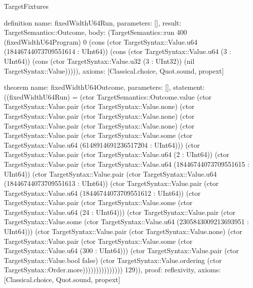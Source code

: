 \begin{lexlean}{TargetFixtures}
\begin{semanticmodule}
definition{
  name: fixedWidthU64Run,
  parameters: [],
  result: TargetSemantics::Outcome,
  body: (TargetSemantics::run 400 (fixedWidthU64Program) 0 (cons (ctor TargetSyntax::Value.u64 (18446744073709551614 : UInt64)) (cons (ctor TargetSyntax::Value.u64 (3 : UInt64)) (cons (ctor TargetSyntax::Value.u32 (3 : UInt32)) (nil TargetSyntax::Value))))),
  axioms: [Classical.choice, Quot.sound, propext]
}

theorem{
  name: fixedWidthU64Outcome,
  parameters: [],
  statement: ((fixedWidthU64Run) = (ctor TargetSemantics::Outcome.value (ctor TargetSyntax::Value.pair (ctor TargetSyntax::Value.none) (ctor TargetSyntax::Value.pair (ctor TargetSyntax::Value.none) (ctor TargetSyntax::Value.pair (ctor TargetSyntax::Value.none) (ctor TargetSyntax::Value.pair (ctor TargetSyntax::Value.some (ctor TargetSyntax::Value.u64 (6148914691236517204 : UInt64))) (ctor TargetSyntax::Value.pair (ctor TargetSyntax::Value.u64 (2 : UInt64)) (ctor TargetSyntax::Value.pair (ctor TargetSyntax::Value.u64 (18446744073709551615 : UInt64)) (ctor TargetSyntax::Value.pair (ctor TargetSyntax::Value.u64 (18446744073709551613 : UInt64)) (ctor TargetSyntax::Value.pair (ctor TargetSyntax::Value.u64 (18446744073709551612 : UInt64)) (ctor TargetSyntax::Value.pair (ctor TargetSyntax::Value.some (ctor TargetSyntax::Value.u64 (24 : UInt64))) (ctor TargetSyntax::Value.pair (ctor TargetSyntax::Value.some (ctor TargetSyntax::Value.u64 (2305843009213693951 : UInt64))) (ctor TargetSyntax::Value.pair (ctor TargetSyntax::Value.none) (ctor TargetSyntax::Value.pair (ctor TargetSyntax::Value.some (ctor TargetSyntax::Value.u64 (300 : UInt64))) (ctor TargetSyntax::Value.pair (ctor TargetSyntax::Value.bool false) (ctor TargetSyntax::Value.ordering (ctor TargetSyntax::Order.more))))))))))))))) 129)),
  proof: reflexivity{},
  axioms: [Classical.choice, Quot.sound, propext]
}


\end{semanticmodule}
\end{lexlean}
